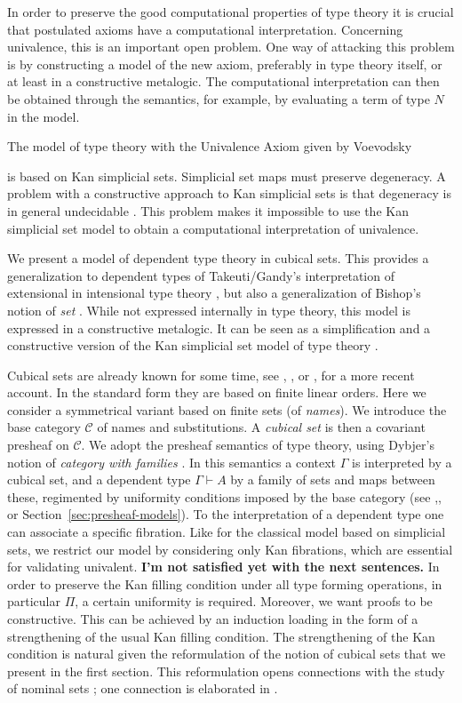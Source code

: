 \documentclass[10pt,a4paper]{article}
\newcommand{\CC}{{\mathcal C}}
\newcommand{\nat}{{N}}
\begin{document}
In order to preserve the good computational properties of type theory it is
crucial that postulated axioms have a computational interpretation.
Concerning univalence, this is an important open problem.
One way of attacking this problem is by constructing a model of the new
axiom, preferably in type theory itself, or at least in a constructive metalogic.
The computational interpretation can then be obtained through the semantics,
for example, by evaluating a term of type $\nat$ in the model.

The model of type theory with the Univalence Axiom given by Voevodsky

\cite{Voevodsky} is based on Kan simplicial sets.
Simplicial set maps must preserve degeneracy.
A problem with a constructive approach to
Kan simplicial sets is that degeneracy is in general undecidable \cite{BC}.
This problem makes it impossible to use the Kan simplicial set model
to obtain a computational interpretation of univalence.

We present a model of dependent type theory in cubical sets.
This provides a generalization to dependent types
of Takeuti/Gandy's interpretation of extensional in intensional type theory \cite{Gandy}, but also
a generalization of Bishop's notion of {\em set} \cite{Bishop}.
While not expressed internally in type theory, this model is expressed in a constructive metalogic.
It can be seen as a simplification and a constructive version of the
Kan simplicial set model of type theory \cite{Voevodsky}.

Cubical sets are already known for some time, see \cite{Serre}, \cite{Kan},
or \cite{Crans}, \cite{Williamson} for a more recent account.
In the standard form they are based on finite linear orders.
Here we consider a symmetrical variant based on finite sets (of \emph{names}).
We introduce the base category $\CC$ of names and substitutions.
A \emph{cubical set} is then a covariant presheaf on $\CC$.
We adopt the presheaf semantics of type theory,
using Dybjer's notion of \emph{category with families} \cite{Dybjer}.
In this semantics a context $\Gamma$ is interpreted by a cubical set,
and a dependent type $\Gamma\vdash A$ by a family of sets and maps between these,
regimented by uniformity conditions imposed by the base category
(see \cite{Dybjer},\cite{Hofmann}, or Section~\ref{sec:presheaf-models}).
To the interpretation of a dependent type one can associate a specific fibration.
Like for the classical model based on simplicial sets,
we restrict our model by considering only Kan fibrations,
which are essential for validating univalent.
{\bf I'm not satisfied yet with the next sentences.}
In order to preserve the Kan filling condition under all type forming
operations, in particular $\Pi$, a certain uniformity is required.
Moreover, we want proofs to be constructive. This can be achieved
by an induction loading in the form of
a strengthening of the usual Kan filling condition. 
The strengthening of the Kan condition is natural given the reformulation of the notion of cubical sets
that we present in the first section. This reformulation opens connections with the study of nominal
sets \cite{pitts}; one connection is elaborated in \cite{Pitts}.
\end{document}

